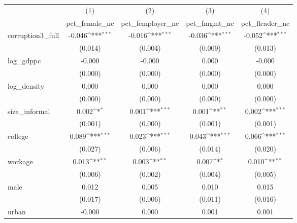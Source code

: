 {
\def\sym#1{\ifmmode^{#1}\else\(^{#1}\)\fi}
\begin{tabular}{l*{4}{c}}
\hline\hline
            &\multicolumn{1}{c}{(1)}&\multicolumn{1}{c}{(2)}&\multicolumn{1}{c}{(3)}&\multicolumn{1}{c}{(4)}\\
            &\multicolumn{1}{c}{pct\_female\_nc}&\multicolumn{1}{c}{pct\_femployer\_nc}&\multicolumn{1}{c}{pct\_fmgmt\_nc}&\multicolumn{1}{c}{pct\_fleader\_nc}\\
\hline
corruption3\_full&      -0.046\sym{***}&      -0.016\sym{***}&      -0.036\sym{***}&      -0.052\sym{***}\\
            &     (0.014)         &     (0.004)         &     (0.009)         &     (0.013)         \\
[1em]
log\_gdppc   &      -0.000         &      -0.000         &       0.000         &      -0.000         \\
            &     (0.000)         &     (0.000)         &     (0.000)         &     (0.000)         \\
[1em]
log\_density &       0.000         &       0.000         &       0.000         &       0.000         \\
            &     (0.000)         &     (0.000)         &     (0.000)         &     (0.000)         \\
[1em]
size\_informal&       0.002\sym{*}  &       0.001\sym{***}&       0.001\sym{**} &       0.002\sym{***}\\
            &     (0.001)         &     (0.000)         &     (0.001)         &     (0.001)         \\
[1em]
college     &       0.089\sym{***}&       0.023\sym{***}&       0.043\sym{***}&       0.066\sym{***}\\
            &     (0.027)         &     (0.006)         &     (0.014)         &     (0.020)         \\
[1em]
workage     &       0.013\sym{**} &       0.003\sym{**} &       0.007\sym{*}  &       0.010\sym{**} \\
            &     (0.006)         &     (0.002)         &     (0.004)         &     (0.005)         \\
[1em]
male        &       0.012         &       0.005         &       0.010         &       0.015         \\
            &     (0.017)         &     (0.006)         &     (0.011)         &     (0.016)         \\
[1em]
urban       &      -0.000         &       0.000         &       0.001         &       0.001         \\

\end{tabular}}
